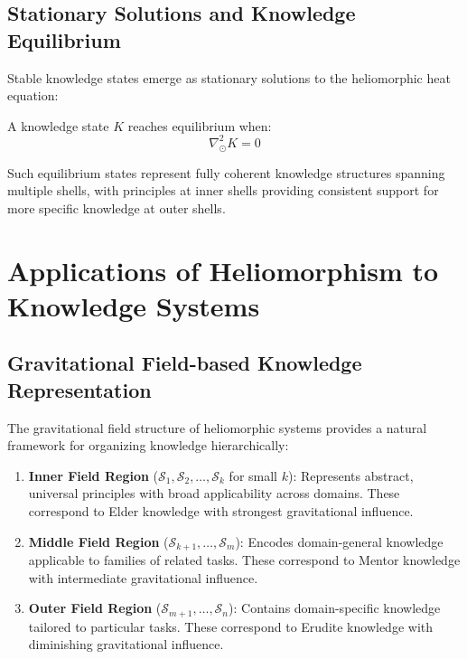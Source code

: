 \subsection{Stationary Solutions and Knowledge Equilibrium}

Stable knowledge states emerge as stationary solutions to the heliomorphic heat equation:

\begin{theorem}
A knowledge state $K$ reaches equilibrium when:
\begin{equation}
\nabla_{\odot}^2 K = 0
\end{equation}
\end{theorem}

Such equilibrium states represent fully coherent knowledge structures spanning multiple shells, with principles at inner shells providing consistent support for more specific knowledge at outer shells.

\section{Applications of Heliomorphism to Knowledge Systems}

\subsection{Gravitational Field-based Knowledge Representation}

The gravitational field structure of heliomorphic systems provides a natural framework for organizing knowledge hierarchically:

\begin{enumerate}
    \item \textbf{Inner Field Region} ($\mathcal{S}_1, \mathcal{S}_2, \dots, \mathcal{S}_k$ for small $k$): Represents abstract, universal principles with broad applicability across domains. These correspond to Elder knowledge with strongest gravitational influence.
    
    \item \textbf{Middle Field Region} ($\mathcal{S}_{k+1}, \dots, \mathcal{S}_{m}$): Encodes domain-general knowledge applicable to families of related tasks. These correspond to Mentor knowledge with intermediate gravitational influence.
    
    \item \textbf{Outer Field Region} ($\mathcal{S}_{m+1}, \dots, \mathcal{S}_n$): Contains domain-specific knowledge tailored to particular tasks. These correspond to Erudite knowledge with diminishing gravitational influence.
\end{enumerate}

